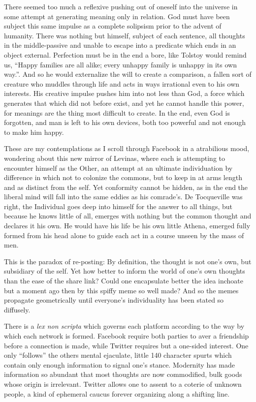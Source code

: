 \documentclass[ebook, 10pt, openright, onecolumn]{memoir}
\newcommand*\td[1]{
  \todo[inline]{
     #1 
  }
}
\newcommand*\finish{\td{ ----- Finish this section -----}}
\begin{document}
\finish{}

There seemed too much a reflexive pushing out of oneself into the universe in
some attempt at generating meaning only in relation.  God must have been subject
this same impulse as a complete solipsism prior to the advent of humanity.  There
was nothing but himself, subject of each sentence, all thoughts in the
middle-passive and unable to escape into a predicate which ends in an object
external.  Perfection must be in the end a bore, like Tolstoy would remind us,
``Happy families are all alike; every unhappy family is unhappy in its own
way.''.  And so he would externalize the will to create a comparison, a fallen
sort of creature who muddles through life and acts in ways irrational even to
his own interests.  His creative impulse pushes him into not less than God, a
force which generates that which did not before exist, and yet he cannot handle
this power, for meanings are the thing most difficult to create.  In the end,
even God is forgotten, and man is left to his own devices, both too powerful and
not enough to make him happy.

These are my contemplations as I scroll through Facebook in a atrabilious mood,
wondering about this new mirror of Levinas, where each is attempting to encounter
himself as the Other, an attempt at an ultimate individuation by difference in
which not to colonize the commons, but to keep in at arms length and as distinct
from the self.  Yet conformity cannot be hidden, as in the end the liberal mind
will fall into the same eddies as his comrade's. De Tocqueville was right, the
Individual goes deep into himself for the answer to all things, but because he
knows little of all, emerges with nothing but the common thought and declares it
his own.  He would have his life be his own little Athena, emerged fully formed
from his head alone to guide each act in a course unseen by the mass of men.

This is the paradox of re-posting: By definition, the thought is not one's own,
but subsidiary of the self.  Yet how better to inform the world of one's own
thoughts than the ease of the share link?  Could one encapsulate better the idea
inchoate but a moment ago then by this spiffy meme so well made?  And so the
memes propagate geometrically until everyone's individuality has been stated so
diffusely.

There is a \textit{lex non scripta} which governs each platform according to the
way by which each network is formed.  Facebook require both parties to aver a
friendship before a connection is made, while Twitter requires but a one-sided
interest.  One only ``follows'' the others mental ejaculate, little 140
character spurts which contain only enough information to signal one's stance.
Modernity has made information so abundant that most thoughts are now
commodified, bulk goods whose origin is irrelevant.  Twitter allows one to
assent to a coterie of unknown people, a kind of ephemeral caucus forever
organizing along a shifting line.
\end{document}
